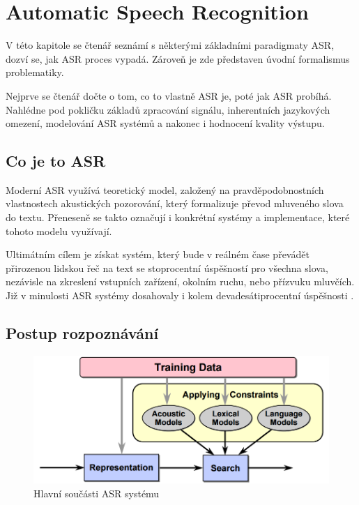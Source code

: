\chapter{Automatic Speech Recognition}

V této kapitole se čtenář seznámí s některými základními paradigmaty ASR, dozví se, jak ASR proces vypadá. Zároveň je zde představen úvodní formalismus problematiky.

Nejprve se čtenář dočte o tom, co to vlastně ASR je, poté jak ASR probíhá. Nahlédne pod pokličku základů zpracování signálu, inherentních jazykových omezení, modelování ASR systémů a nakonec i hodnocení kvality výstupu.

\section{Co je to ASR}

Moderní ASR využívá teoretický model, založený na pravděpodobnostních vlastnostech akustických pozorování, který formalizuje převod mluveného slova do textu. Přeneseně se takto označují i konkrétní systémy a implementace, které tohoto modelu využívají. 

Ultimátním cílem  je získat systém, který bude v reálném čase převádět přirozenou lidskou řeč na text se stoprocentní úspěšností pro všechna slova, nezávisle na zkreslení vstupních zařízení, okolním ruchu, nebo přízvuku mluvčích. Již v minulosti ASR systémy dosahovaly i kolem devadesátiprocentní úspěšnosti \cite{jelinek_1976}.

\section{Postup rozpoznávání}

\begin{figure}[h]
	\centering
	\includegraphics[width=140mm]{img/asr_process.png}
	\caption{Hlavní součásti ASR systému \cite{mit_asr_2003}}
	\label{fig:asr_process}
\end{figure}

